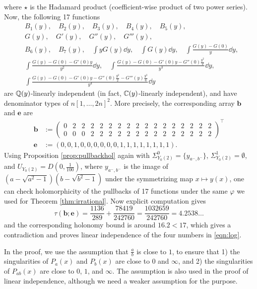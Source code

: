 where $\star$ is the Hadamard product (coefficient-wise product of two power series).
Now, the following 17 functions
\begin{align*}
    &B_1(y), \quad B_2(y), \quad B_3(y), \quad B_4(y), \quad B_5(y), \\
    &G(y), \quad G'(y), \quad G''(y), \quad G'''(y), \\
    &B_6(y), \quad B_7(y), \quad \int y G(y) \dd y, \quad \int G(y) \dd y, \quad \int \frac{G(y) - G(0)}{y} \dd y, \\
    &\int \frac{G(y) - G(0) - G'(0)y}{y^2} \dd y, \quad \int \frac{G(y) - G(0) - G'(0)y - G''(0) \frac{y^2}{2}}{y^3} \dd y,\\
    &\int \frac{G(y) - G(0) - G'(0)y - G''(0) \frac{y^2}{2} - G'''(y) \frac{y^3}{6}}{y^4} \dd y
\end{align*}
are $\mathbb{Q}(y)$-linearly independent (in fact, $\mathbb{C}(y)$-linearly independent), and have denominator types of $n [1, \dots, 2n]^2$.
More precisely, the corresponding array $\mathbf{b}$ and $\mathbf{e}$ are
\begin{align*}
    \mathbf{b} &:= \begin{pmatrix}
        0 & 2 & 2 & 2 & 2 & 2 & 2 & 2 & 2 & 2 & 2 & 2 & 2 & 2 & 2 & 2 & 2 \\
        0 & 0 & 0 & 2 & 2 & 2 & 2 & 2 & 2 & 2 & 2 & 2 & 2 & 2 & 2 & 2 & 2
    \end{pmatrix}^\intercal \\
    \mathbf{e} &:= (0, 0, 1, 0, 0, 0, 0, 0, 0, 1, 1, 1, 1, 1, 1, 1, 1).
\end{align*}
Using Proposition \ref{prop:pullbackhol} again with $\Sigma_{Y_0(2)}^0 = \{y_{a^-, b^-}\}$, $\Sigma_{Y_0(2)}^1 = \emptyset$, and $U_{Y_0(2)} = D(0, \frac{1}{100})$, where $y_{a^-, b^-}$ is the image of $(a - \sqrt{a^2 - 1})(b - \sqrt{b^2 - 1})$ under the symmetrizing map $x \mapsto y(x)$, one can check holomorphicity of the pullbacks of 17 functions under the same $\varphi$ we used for Theorem \ref{thm:irrational}.
Now explicit computation gives
$$
    \tau(\mathbf{b}; \mathbf{e}) = \frac{1136}{289} + \frac{78419}{242760} = \frac{1032659}{242760} = 4.2538\dots
$$
and the corresponding holonomy bound is around $16.2 < 17$, which gives a contradiction and proves linear independence of the four numbers in \eqref{eqn:log}.

In the proof, we use the assumption that $\frac{a}{b}$ is close to $1$, to ensure that 1) the singularities of $P_a(x)$ and $P_b(x)$ are close to $0$ and $\infty$, and 2) the singularities of $P_{ab}(x)$ are close to $0$, $1$, and $\infty$.
The assumption is also used in the proof of linear independence, although we need a weaker assumption for the purpose.